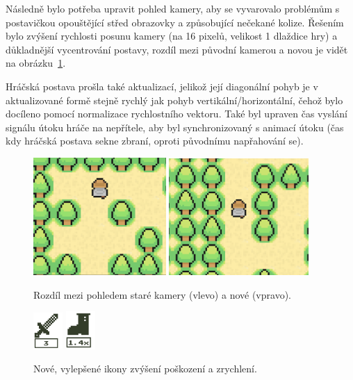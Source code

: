 Následně bylo potřeba upravit pohled kamery, aby se vyvarovalo problémům s postavičkou opouštějící střed obrazovky a způsobující nečekané kolize. Řešením bylo zvýšení rychlosti posunu kamery (na 16 pixelů, velikost 1 dlaždice hry) a důkladnější vycentrování postavy, rozdíl mezi původní kamerou a novou je vidět na obrázku~\ref{fig:rozdil_kamer}.

Hráčská postava prošla také aktualizací, jelikož její diagonální pohyb je v aktualizované formě stejně rychlý jak pohyb vertikální/horizontální, čehož bylo docíleno pomocí normalizace rychlostního vektoru. Také byl upraven čas vyslání signálu útoku hráče na nepřítele, aby byl synchronizovaný s animací útoku (čas kdy hráčská postava sekne zbraní, oproti původnímu napřahování se).

\begin{figure}[hb]
    \centering
    \includegraphics[width=0.45\textwidth]{obrazky-figures/ch5/old_camera.png}\hspace{0.5cm}
    \includegraphics[width=0.474\textwidth]{obrazky-figures/ch5/new_camera.png}
    \caption{Rozdíl mezi pohledem staré kamery (vlevo) a nové (vpravo).}
    \label{fig:rozdil_kamer}
\end{figure}

\begin{figure}[ht]
    \centering
    \includegraphics[width=0.1\textwidth]{obrazky-figures/ch5/new_demage.png}\hspace{3cm}
    \includegraphics[width=0.1\textwidth]{obrazky-figures/ch5/new_speed.png}
    \caption{Nové, vylepšené ikony zvýšení poškození a zrychlení.}
    \label{fig:new_icons}
\end{figure}


